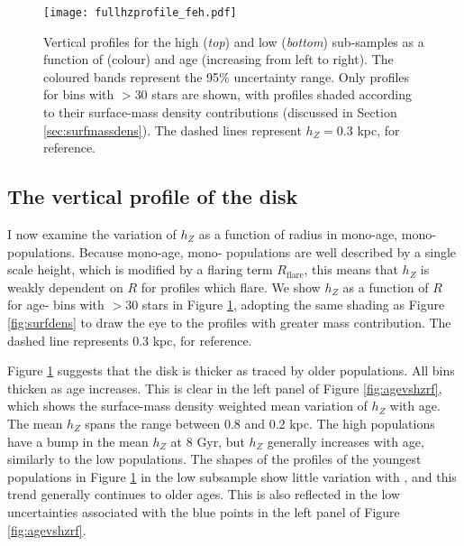 \begin{landscape}
 \begin{figure}
 	\texttt{[image: fullhzprofile\_feh.pdf]}
 	\centering
     \caption[Radial scale height profiles of mono-age, mono-\feh{} populations in the low and high \afe{} disk components]{Vertical profiles for the high \afe{} (\emph{top}) and low \afe{} (\emph{bottom}) sub-samples as a function of \feh{} (colour) and age (increasing from left to right). The coloured bands represent the 95\% uncertainty range. Only profiles for bins with $> 30$ stars are shown, with profiles shaded according to their surface-mass density contributions (discussed in Section \ref{sec:surfmassdens}).  The dashed lines represent $h_Z = 0.3$ kpc, for reference.}
     \label{fig:hzprofile}
 \end{figure}
\end{landscape}


\subsection{The vertical profile of the disk}
I now examine the variation of $h_Z$ as a function of radius in mono-age, mono-\feh{} populations. Because mono-age, mono-\feh{} populations are well described by a single scale height, which is modified by a flaring term $R_{\text{flare}}$, this means that $h_Z$ is weakly dependent on $R$ for profiles which flare. We show $h_Z$ as a function of $R$ for age-\feh{} bins with $> 30$ stars in Figure \ref{fig:hzprofile}, adopting the same shading as Figure \ref{fig:surfdens} to draw the eye to the profiles with greater mass contribution. The dashed line represents $0.3$ kpc, for reference.

Figure \ref{fig:hzprofile} suggests that the disk is thicker as traced by older populations. All \feh{} bins thicken as age increases. This is clear in the left panel of Figure \ref{fig:agevshzrf}, which shows the surface-mass density weighted mean variation of $h_Z$ with age. The mean $h_Z$ spans the range between 0.8 and 0.2 kpc. The high \afe{} populations have  a bump in the mean $h_Z$ at 8 Gyr, but $h_Z$ generally increases with age, similarly to the low \afe{} populations. The shapes of the profiles of the youngest populations in Figure \ref{fig:hzprofile} in the low \afe{} subsample show little variation with \feh{}, and this trend generally continues to older ages. This is also reflected in the low uncertainties associated with the blue points in the left panel of Figure \ref{fig:agevshzrf}. 

